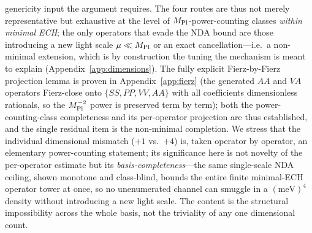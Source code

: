 \documentclass[aps,prd,twocolumn,superscriptaddress,showpacs,preprintnumbers,nofootinbib,longbibliography,floatfix]{revtex4-2}
\begin{document}
genericity input the argument requires. The four routes are thus not merely
representative but exhaustive at the level of $M_{\rm Pl}$-power-counting classes
\emph{within minimal ECH}; the only operators that evade the NDA bound are those
introducing a new light scale $\mu\ll M_{\rm Pl}$ or an exact cancellation---i.e.\
a non-minimal extension, which is by construction the tuning the mechanism is
meant to explain (Appendix~\ref{app:dimensions}). The fully explicit
Fierz-by-Fierz projection lemma is proven in Appendix~\ref{app:fierz} (the
generated $AA$ and $VA$ operators Fierz-close onto $\{SS,PP,VV,AA\}$ with all
coefficients dimensionless rationals, so the $M_{\rm Pl}^{-2}$ power is preserved
term by term); both the power-counting-class completeness and its per-operator
projection are thus established, and the single residual item is the non-minimal
completion. We stress that
the individual dimensional mismatch ($+1$ vs.\ $+4$) is, taken operator by
operator, an elementary power-counting statement; its significance here is not
novelty of the per-operator estimate but its \emph{basis-completeness}---the same
single-scale NDA ceiling, shown monotone and class-blind, bounds the entire
finite minimal-ECH operator tower at once, so no unenumerated channel can smuggle
in a $(\text{meV})^4$ density without introducing a new light scale. The content
is the structural impossibility across the whole basis, not the triviality of any
one dimensional count.
\end{document}
